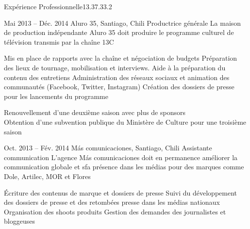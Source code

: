 \documentclass[30pt, french]{tccv}
\begin{document}
\begin{upshape}
\begin{flat_frame}{Expérience Professionnelle}{13.3}{7.3}{3.2}{}
\begin{eventlist}
    
    
\setlength{\parskip}{0pt}        
\item{Mai 2013 -- Déc. 2014}
     {Aluro 35, Santiago, Chili}
     {Productrice générale}
     \fontsize{9pt}{1em}\color{text}\bodyfontlight\upshape\selectfont
%
 La maison de production indépendante Aluro 35 doit produire le programme culturel de télévision  transmis par la chaîne 13C \\
    
    \setlength{\parskip}{-10pt}
    \begin{itemize}
      \setlength\itemsep{-3pt} 
      \cvitem[\checkmark] Mis en place de rapports avec la chaîne et négociation de budgets                       
      \cvitem[\checkmark] Préparation des lieux de tournage, mobilisation et interviews. Aide à la préparation du contenu des entretiens 
      \cvitem[\checkmark] Administration des réseaux sociaux et animation des communautés (Facebook, Twitter, Instagram)                 
      \cvitem[\checkmark] Création des dossiers de presse pour les lancements du programme                                             
    \end{itemize}     
 Renouvellement d'une deuxième saison avec plus de sponsors \\
\mission{}           Obtention d’une subvention publique du Ministère de Culture pour une troisième saison  \\




\setlength{\parskip}{0pt}    
\item{Oct. 2013 -- Fév. 2014 }     
  {Más comunicaciones, Santiago, Chili}     
  {Assistante communication}
     \fontsize{9pt}{1em}\color{text}\bodyfontlight\upshape\selectfont
%    
 L’agence Más comunicaciones doit en permanence améliorer la communication globale et sfa présence dans les médias
pour des marques comme Dole, Artilec, MOR et Flores\\

\setlength{\parskip}{-10pt}
\begin{itemize}
      \setlength\itemsep{-3pt} 
      \cvitem[\checkmark]  Écriture des contenus de marque et dossiers de presse                                        
      \cvitem[\checkmark]  Suivi du développement des dossiers de presse et des retombées presse dans les médias nationaux                                             
      \cvitem[\checkmark]  Organisation des shoots produits 
      \cvitem[\checkmark]  Gestion des demandes des journalistes et bloggeuses 


\end{itemize}
\end{eventlist}
\end{flat_frame}
\end{upshape}
\end{document}
